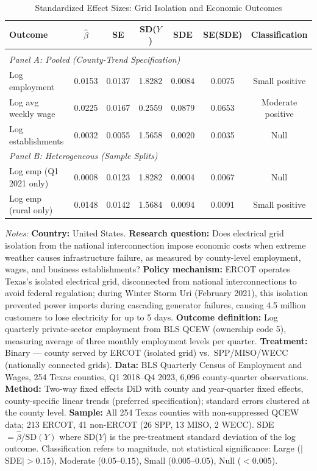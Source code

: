 \begin{table}[htbp]
\centering
\caption{Standardized Effect Sizes: Grid Isolation and Economic Outcomes}
\label{tab:sde}
\small
\begin{tabular}{lcccccc}
\hline\hline
Outcome & $\hat{\beta}$ & SE & SD($Y$) & SDE & SE(SDE) & Classification \\
\hline
\\[-6pt]
\multicolumn{7}{l}{\textit{Panel A: Pooled (County-Trend Specification)}} \\[3pt]
Log employment & 0.0153 & 0.0137 & 1.8282 & 0.0084 & 0.0075 & Small positive \\
Log avg weekly wage & 0.0225 & 0.0167 & 0.2559 & 0.0879 & 0.0653 & Moderate positive \\
Log establishments & 0.0032 & 0.0055 & 1.5658 & 0.0020 & 0.0035 & Null \\[6pt]
\multicolumn{7}{l}{\textit{Panel B: Heterogeneous (Sample Splits)}} \\[3pt]
Log emp (Q1 2021 only) & 0.0008 & 0.0123 & 1.8282 & 0.0004 & 0.0067 & Null \\
Log emp (rural only) & 0.0148 & 0.0142 & 1.5684 & 0.0094 & 0.0091 & Small positive \\
\hline\hline
\end{tabular}
\begin{tablenotes}
\small
\item \textit{Notes:} \textbf{Country:} United States. \textbf{Research question:} Does electrical grid isolation from the national interconnection impose economic costs when extreme weather causes infrastructure failure, as measured by county-level employment, wages, and business establishments? \textbf{Policy mechanism:} ERCOT operates Texas's isolated electrical grid, disconnected from national interconnections to avoid federal regulation; during Winter Storm Uri (February 2021), this isolation prevented power imports during cascading generator failures, causing 4.5 million customers to lose electricity for up to 5 days. \textbf{Outcome definition:} Log quarterly private-sector employment from BLS QCEW (ownership code 5), measuring average of three monthly employment levels per quarter. \textbf{Treatment:} Binary --- county served by ERCOT (isolated grid) vs.\ SPP/MISO/WECC (nationally connected grids). \textbf{Data:} BLS Quarterly Census of Employment and Wages, 254 Texas counties, Q1 2018--Q4 2023, 6,096 county-quarter observations. \textbf{Method:} Two-way fixed effects DiD with county and year-quarter fixed effects, county-specific linear trends (preferred specification); standard errors clustered at the county level. \textbf{Sample:} All 254 Texas counties with non-suppressed QCEW data; 213 ERCOT, 41 non-ERCOT (26 SPP, 13 MISO, 2 WECC). SDE $= \hat{\beta} / \text{SD}(Y)$ where SD($Y$) is the pre-treatment standard deviation of the log outcome. Classification refers to magnitude, not statistical significance: Large ($|$SDE$| > 0.15$), Moderate ($0.05$--$0.15$), Small ($0.005$--$0.05$), Null ($< 0.005$).
\end{tablenotes}
\end{table}

